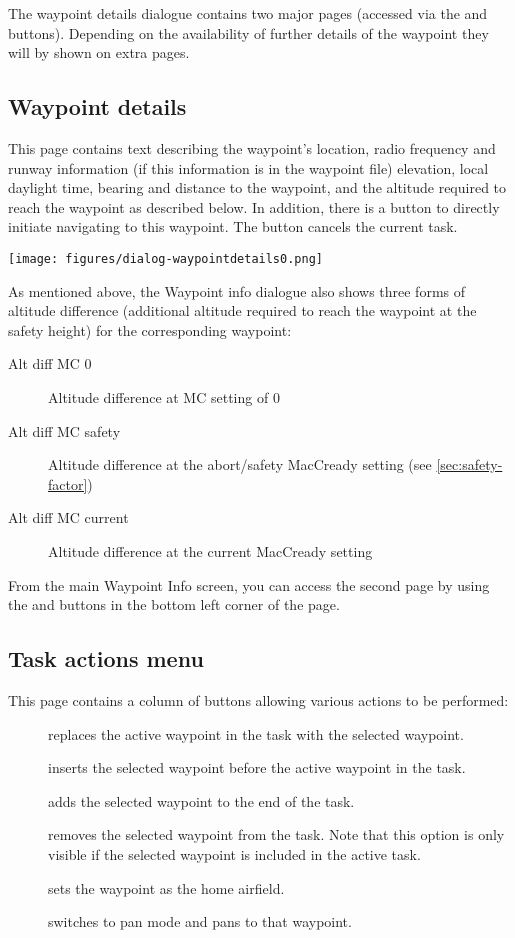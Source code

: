 The waypoint details dialogue contains two major pages (accessed via the
\bmenuw{$>$} and \bmenuw{$<$} buttons). Depending on the availability of further
details of the waypoint they will by shown on extra pages.

\subsection*{Waypoint details}\label{sec:waypointdetails}
This page contains text describing the waypoint's location, radio frequency and
runway information (if this information is in the waypoint file) elevation,
local daylight time, bearing and distance to the waypoint, and the altitude required
to reach the waypoint as described below. In addition, there is a button
 to directly initiate
navigating to this waypoint. The button cancels the current task.
\begin{center}
\texttt{[image: figures/dialog-waypointdetails0.png]}
\end{center}

As mentioned above, the Waypoint info dialogue also shows three forms of altitude
difference (additional
altitude required to reach the waypoint at the safety height) for
the corresponding waypoint:
\begin{description}
\item[Alt diff MC 0] Altitude difference at MC setting of 0
\item[Alt diff MC safety] Altitude difference at the abort/safety MacCready
  setting (see \ref{sec:safety-factor})
\item[Alt diff MC current] Altitude difference at the current MacCready setting
\end{description}

From the main Waypoint Info screen, you can access the second page by using the
\bmenuw{$>$} and \bmenuw{$<$} buttons in the bottom left corner of the page.
\subsection*{Task actions menu}
This page contains a column of buttons allowing various actions to be performed:
\begin{description}
\item[] replaces the active waypoint in the task with
  the selected waypoint.
\item[] inserts the selected waypoint before the active
  waypoint in
  the task.
\item[] adds the selected waypoint to the end of the task.
\item[] removes the selected waypoint from the task.
  Note that this option is only visible if the selected waypoint is included in
  the active task.
\item[] sets the waypoint as the home airfield.
\item[] switches to pan mode and pans to that waypoint.
\end{description}

